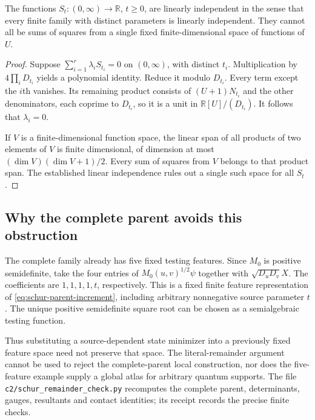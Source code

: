 \begin{proposition}
The functions $S_t:(0,\infty)\to\mathbb R$, $t\geq0$, are linearly
independent in the sense that every finite family with distinct parameters
is linearly independent. They cannot all be sums of squares from a single
fixed finite-dimensional space of functions of $U$.
\end{proposition}
\begin{proof}
Suppose $\sum_{i=1}^r\lambda_iS_{t_i}=0$ on $(0,\infty)$, with distinct
$t_i$. Multiplication by $4\prod_iD_{t_i}$ yields a polynomial identity.
Reduce it modulo $D_{t_i}$. Every term except the $i$th vanishes. Its
remaining product consists of $(U+1)N_{t_i}$ and the other denominators,
each coprime to $D_{t_i}$, so it is a unit in
$\mathbb R[U]/(D_{t_i})$. It follows that $\lambda_i=0$.

If $V$ is a finite-dimensional function space, the linear span of all
products of two elements of $V$ is finite dimensional, of dimension at
most $(\dim V)(\dim V+1)/2$. Every sum of squares from $V$ belongs to
that product span. The established linear independence rules out a
single such space for all $S_t$.
\end{proof}

\subsection{Why the complete parent avoids this obstruction}

The complete family already has five fixed testing features. Since $M_0$
is positive semidefinite, take the four entries of
$M_0(u,v)^{1/2}\psi$ together with $\sqrt{D_uD_v}X$. The coefficients
are $1,1,1,1,t$, respectively. This is a fixed finite feature
representation of \eqref{eq:schur-parent-increment}, including arbitrary
nonnegative source parameter $t$. The unique positive semidefinite square
root can be chosen as a semialgebraic testing function.

Thus substituting a source-dependent state minimizer into a previously
fixed feature space need not preserve that space. The literal-remainder
argument cannot be used to reject the complete-parent local construction,
nor does the five-feature example supply a global atlas for arbitrary
quantum supports. The file \nolinkurl{c2/schur_remainder_check.py}
recomputes the complete parent, determinants, gauges, resultants and
contact identities; its receipt records the precise finite checks.
